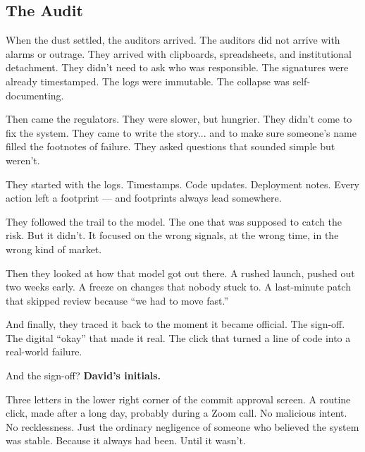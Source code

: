 \subsection{The Audit}

When the dust settled, the auditors arrived.
The auditors did not arrive with alarms or outrage. They arrived with clipboards, spreadsheets, and institutional detachment.
They didn’t need to ask who was responsible. The signatures were already timestamped. The logs were immutable. 
The collapse was self-documenting.

Then came the regulators.
They were slower, but hungrier.
They didn’t come to fix the system. They came to write the story... and to make sure someone’s name filled 
the footnotes of failure. They asked questions that sounded simple but weren’t.

They started with the logs.
Timestamps. Code updates. Deployment notes.
Every action left a footprint — and footprints always lead somewhere.

They followed the trail to the model.
The one that was supposed to catch the risk.
But it didn’t.
It focused on the wrong signals, at the wrong time, in the wrong kind of market.

Then they looked at how that model got out there.
A rushed launch, pushed out two weeks early.
A freeze on changes that nobody stuck to.
A last-minute patch that skipped review because “we had to move fast.”

And finally, they traced it back to the moment it became official.
The sign-off.
The digital “okay” that made it real.
The click that turned a line of code into a real-world failure.

And the sign-off?  \textbf{David’s initials.}

Three letters in the lower right corner of the commit approval screen.
A routine click, made after a long day, probably during a Zoom call.
No malicious intent. No recklessness.
Just the ordinary negligence of someone who believed the system was stable.
Because it always had been.  Until it wasn’t.

\medskip

